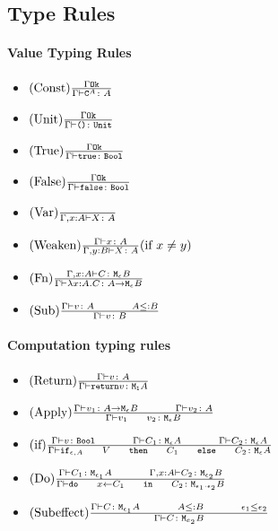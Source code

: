 \documentclass{report}
\begin{document}
    \subsection{Type Rules}
    \paragraph{Value Typing Rules}
    \begin{itemize}
        \item $(\text{Const}) \frac{\Gamma \texttt{Ok}}{\Gamma \vdash \texttt{C}^{A} \colon A}$
        \item $(\text{Unit}) \frac{\Gamma \texttt{Ok}}{\Gamma \vdash \texttt{()} \colon \texttt{Unit}}$
        \item $(\text{True}) \frac{\Gamma \texttt{Ok}}{\Gamma \vdash \texttt{true} \colon \texttt{Bool}}$
        \item $(\text{False}) \frac{\Gamma \texttt{Ok}}{\Gamma \vdash \texttt{false} \colon \texttt{Bool}}$
        \item $(\text{Var}) \frac{}{\Gamma, x: A \vdash X \colon A}$
        \item $(\text{Weaken}) \frac{\Gamma \vdash x \colon A}{\Gamma, y: B \vdash X \colon A}(\text{if } x \neq y)$
        \item $(\text{Fn}) \frac{\Gamma, x: A \vdash C \colon \texttt{M}_{\epsilon}{B}}{\Gamma \vdash \lambda x : A. C \colon A \rightarrow \texttt{M}_{\epsilon}{B}}$
        \item $\treerule{Sub}{\typerelation{\G}{v}{A}\s\s A \subtype B}{\typerelation{\G}{v}{B}}$
    \end{itemize}
    \paragraph{Computation typing rules}
    \begin{itemize}
        \item $(\text{Return}) \frac{\Gamma \vdash v \colon A}{\Gamma \vdash \texttt{return} v \colon \texttt{M}_{\texttt{1}}{A}}$
        \item $\treerule{Apply}{\typerelation{\G}{v_1}{\lamtype{A}{\e}{B}}\s\s\typerelation{\G}{v_2}{A}}{\typerelation{\G}{\apply{v_1}{v_2}}{\meb}}$
        \item $\treerule{if}{\typerelation{\G}{v}{\B} \s\s \typerelation{\G}{C_1}{\mea}\s\s\typerelation{\G}{C_2}{\mea}}{\typerelation{\G}{\ifthenelse{\e}{A}{V}{C_1}{C_2}}{\mea}}$
        \item $\treerule{Do}{\typerelation{\G}{C_1}{\M{\e_1}{A}} \s\s \typerelation{\gax}{C_2}{\M{\e_2}{B}}}{\typerelation{\G}{\doin{x}{C_1}{C_2}}{\M{\e_1 \dot \e_2}{B}}}$
        \item $\treerule{Subeffect}{\typerelation{\G}{C}{\M{\e_1}{A}}\s\s A \subtype B \s\s \e_1 \subeffect \e_2}{\typerelation{\G}{C}{\M{e_2}{B}}}$
    \end{itemize}
\end{document}
